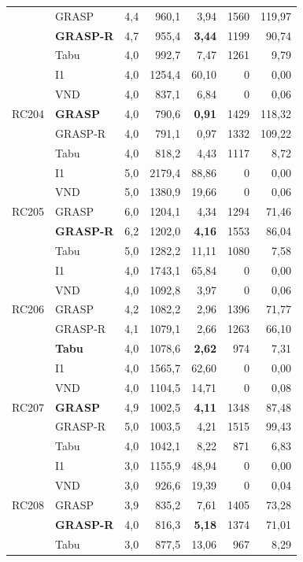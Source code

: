 {\begin{longtable}{llrrrrr}
  & GRASP & 4,4 & 960,1 & 3,94 & 1560 & 119,97 \\
  & \textbf{GRASP-R} & 4,7 & 955,4 & \textbf{3,44} & 1199 & 90,74 \\
  & Tabu & 4,0 & 992,7 & 7,47 & 1261 & 9,79 \\
\midrule
\multirow{5}{*}{RC204}
  & I1 & 4,0 & 1254,4 & 60,10 & 0 & 0,00 \\
  & VND & 4,0 & 837,1 & 6,84 & 0 & 0,06 \\
  & \textbf{GRASP} & 4,0 & 790,6 & \textbf{0,91} & 1429 & 118,32 \\
  & GRASP-R & 4,0 & 791,1 & 0,97 & 1332 & 109,22 \\
  & Tabu & 4,0 & 818,2 & 4,43 & 1117 & 8,72 \\
\midrule
\multirow{5}{*}{RC205}
  & I1 & 5,0 & 2179,4 & 88,86 & 0 & 0,00 \\
  & VND & 5,0 & 1380,9 & 19,66 & 0 & 0,06 \\
  & GRASP & 6,0 & 1204,1 & 4,34 & 1294 & 71,46 \\
  & \textbf{GRASP-R} & 6,2 & 1202,0 & \textbf{4,16} & 1553 & 86,04 \\
  & Tabu & 5,0 & 1282,2 & 11,11 & 1080 & 7,58 \\
\midrule
\multirow{5}{*}{RC206}
  & I1 & 4,0 & 1743,1 & 65,84 & 0 & 0,00 \\
  & VND & 4,0 & 1092,8 & 3,97 & 0 & 0,06 \\
  & GRASP & 4,2 & 1082,2 & 2,96 & 1396 & 71,77 \\
  & GRASP-R & 4,1 & 1079,1 & 2,66 & 1263 & 66,10 \\
  & \textbf{Tabu} & 4,0 & 1078,6 & \textbf{2,62} & 974 & 7,31 \\
\midrule
\multirow{5}{*}{RC207}
  & I1 & 4,0 & 1565,7 & 62,60 & 0 & 0,00 \\
  & VND & 4,0 & 1104,5 & 14,71 & 0 & 0,08 \\
  & \textbf{GRASP} & 4,9 & 1002,5 & \textbf{4,11} & 1348 & 87,48 \\
  & GRASP-R & 5,0 & 1003,5 & 4,21 & 1515 & 99,43 \\
  & Tabu & 4,0 & 1042,1 & 8,22 & 871 & 6,83 \\
\midrule
\multirow{5}{*}{RC208}
  & I1 & 3,0 & 1155,9 & 48,94 & 0 & 0,00 \\
  & VND & 3,0 & 926,6 & 19,39 & 0 & 0,04 \\
  & GRASP & 3,9 & 835,2 & 7,61 & 1405 & 73,28 \\
  & \textbf{GRASP-R} & 4,0 & 816,3 & \textbf{5,18} & 1374 & 71,01 \\
  & Tabu & 3,0 & 877,5 & 13,06 & 967 & 8,29 \\
\end{longtable}
}
